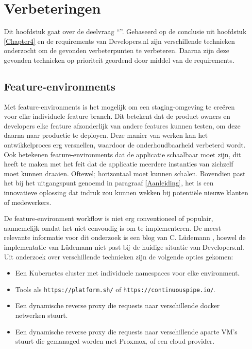 \chapter{Verbeteringen}

\label{Chapter5}

Dit hoofdstuk gaat over de deelvraag \enquote{\deelverbetering}. Gebaseerd op de conclusie uit hoofdstuk \ref{Chapter4} en de requirements van Developers.nl zijn verschillende technieken onderzocht om de gevonden verbeterpunten te verbeteren. Daarna zijn deze gevonden technieken op prioriteit geordend door middel van de requirements. 

\section{Feature-environments}
\label{VerbeteringFeatureEnvironments}
Met feature-environments is het mogelijk om een staging-omgeving te creëren voor elke individuele feature branch. Dit betekent dat de product owners en developers elke feature afzonderlijk van andere features kunnen testen, om deze daarna naar productie te deployen. Deze manier van werken kan het ontwikkelproces erg versnellen, waardoor de onderhoudbaarheid verbeterd wordt. Ook betekenen feature-environments dat de applicatie schaalbaar moet zijn, dit heeft te maken met het feit dat de applicatie meerdere instanties van zichzelf moet kunnen draaien. Oftewel; horizontaal moet kunnen schalen. Bovendien past het bij het uitgangspunt genoemd in paragraaf \ref{Aanleiding}, het is een innovatieve oplossing dat indruk zou kunnen wekken bij potentiële nieuwe klanten of medewerkers.

De feature-environment workflow is niet erg conventioneel of populair, aannemelijk omdat het niet eenvoudig is om te implementeren. De meest relevante informatie voor dit onderzoek is een blog van C. Lüdemann \parencite{FeatureEnvs}, hoewel de implementatie van Lüdemann niet past bij de huidige situatie van Developers.nl. Uit onderzoek over verschillende technieken zijn de volgende opties gekomen:
\begin{itemize}
	\item Een Kubernetes cluster met individuele namespaces voor elke environment.
	\item Tools als \texttt{https://platform.sh/} of \texttt{https://continuouspipe.io/}.
	\item Een dynamische reverse proxy die requests naar verschillende docker netwerken stuurt.
	\item Een dynamische reverse proxy die requests naar verschillende aparte VM's stuurt die gemanaged worden met Proxmox, of een cloud provider.
\end{itemize}

